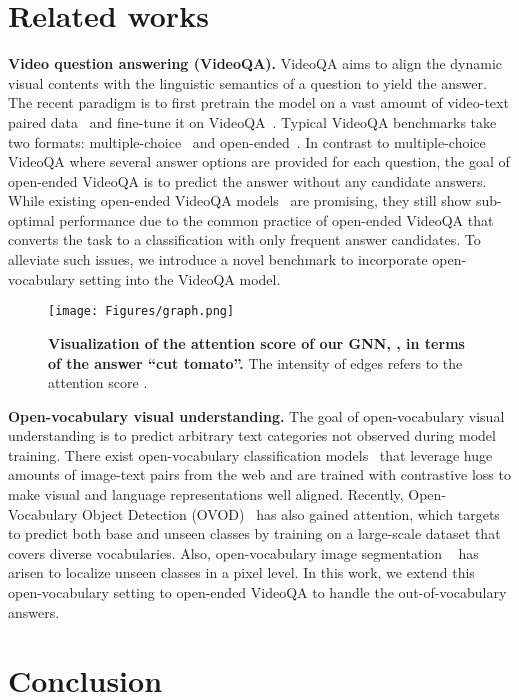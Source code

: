 \documentclass[10pt,twocolumn,letterpaper]{article}
\begin{document}
  \section{Related works}

\noindent \textbf{Video question answering (VideoQA).}
VideoQA aims to align the dynamic visual contents with the linguistic semantics of a question to yield the answer.
The recent paradigm is to first pretrain the model on a vast amount of video-text paired data~\cite{zellers2021merlot, bain2021frozen, miech2019howto100m} and fine-tune it on VideoQA~\cite{wang2022all, fu2021violet,  yang2022zero, bain2021frozen, zeng2022x, li2022align}.
Typical VideoQA benchmarks take two formats: multiple-choice~\cite{li2020hero, lei2018tvqa} and open-ended~\cite{yang2021just, jang2017tgif, xu2017video, yu2019activitynet}.
In contrast to multiple-choice VideoQA where several answer options are provided for each question, the goal of open-ended VideoQA is to predict the answer without any candidate answers.
While existing open-ended VideoQA models~\cite{lei2021less,wang2022all,li2020hero,fu2021violet,zellers2021merlot,le2020hierarchical,yang2022zero} are promising, they still show sub-optimal performance due to the common practice of open-ended VideoQA that converts the task to a classification with only frequent answer candidates.
To alleviate such issues, we introduce a novel benchmark to incorporate open-vocabulary setting into the VideoQA model.

\begin{figure}[t]
    \vspace{-1mm}
    \centering
    \texttt{[image: Figures/graph.png]}
    \caption{\textbf{Visualization of the attention score of our GNN, , in terms of the answer ``cut tomato''.}
    The intensity of edges refers to the attention score .
    }
    \vspace{-1mm}
    \label{fig:graph}
\end{figure} \noindent \textbf{Open-vocabulary visual understanding.}
The goal of open-vocabulary visual understanding is to predict arbitrary text categories not observed during model training.
There exist open-vocabulary classification models~\cite{radford2021learning, jia2021scaling} that leverage huge amounts of image-text pairs from the web and are trained with contrastive loss to make visual and language representations well aligned.
Recently, Open-Vocabulary Object Detection (OVOD)~\cite{zareian2021open,minderer2022simple,gu2021open, zhong2022regionclip, du2022learning, zhou2022detecting} has also gained attention, which targets to predict both base and unseen classes by training on a large-scale dataset that covers diverse vocabularies.
Also, open-vocabulary image segmentation ~\cite{huynh2022open,zhou2022maskclip,zhao2017open,xu2022simple,liang2022open,bucher2019zero,li2022language,ghiasi2022scaling,ding2022open} has arisen to localize unseen classes in a pixel level.
In this work, we extend this open-vocabulary setting to open-ended VideoQA to handle the out-of-vocabulary answers. \section{Conclusion}
\end{document}
